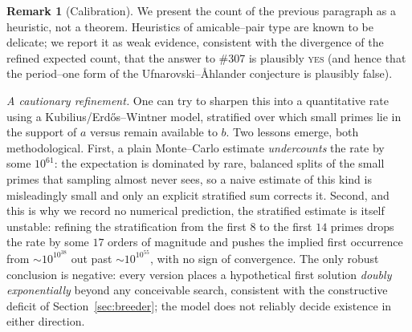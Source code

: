 \documentclass[11pt]{article}
\theoremstyle{definition}
\newtheorem{remark}[theorem]{Remark}
\begin{document}
\begin{remark}[Calibration]
We present the count of the previous paragraph as a heuristic, not a theorem. Heuristics of
amicable--pair type are known to be delicate; we report it as weak evidence, consistent with the
divergence of the refined expected count, that the answer to \#307 is plausibly \textsc{yes}
(and hence that the period--one form of the Ufnarovski--\AA hlander conjecture is plausibly false).
\end{remark}

\emph{A cautionary refinement.} One can try to sharpen this into a quantitative rate using a Kubilius/Erd\H{o}s--Wintner model,
stratified over which small primes lie in the support of $a$ versus remain available to $b$. Two
lessons emerge, both methodological. First, a plain Monte--Carlo estimate \emph{undercounts} the rate
by some $10^{61}$: the expectation is dominated by rare, balanced splits of the small primes that
sampling almost never sees, so a naive estimate of this kind is misleadingly small and only an
explicit stratified sum corrects it. Second, and this is why we record no numerical prediction,
the stratified estimate is itself unstable: refining the stratification from the first $8$ to the
first $14$ primes drops the rate by some $17$ orders of magnitude and pushes the implied first
occurrence from $\sim10^{10^{38}}$ out past $\sim10^{10^{55}}$, with no sign of convergence. The only
robust conclusion is negative: every version places a hypothetical first solution \emph{doubly
exponentially} beyond any conceivable search, consistent with the constructive deficit of
Section~\ref{sec:breeder}; the model does not reliably decide existence in either direction.
\end{document}
